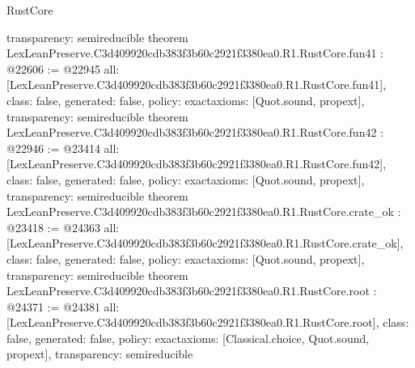 \begin{lexlean}{RustCore}
\begin{coremodule}
{  transparency: semireducible
}
theorem LexLeanPreserve.C3d409920cdb383f3b60c2921f3380ea0.R1.RustCore.fun41 : @22606 := @22945 {
  all: [LexLeanPreserve.C3d409920cdb383f3b60c2921f3380ea0.R1.RustCore.fun41],
  class: false,
  generated: false,
  policy: exact{axioms: [Quot.sound, propext]},
  transparency: semireducible
}
theorem LexLeanPreserve.C3d409920cdb383f3b60c2921f3380ea0.R1.RustCore.fun42 : @22946 := @23414 {
  all: [LexLeanPreserve.C3d409920cdb383f3b60c2921f3380ea0.R1.RustCore.fun42],
  class: false,
  generated: false,
  policy: exact{axioms: [Quot.sound, propext]},
  transparency: semireducible
}
theorem LexLeanPreserve.C3d409920cdb383f3b60c2921f3380ea0.R1.RustCore.crate_ok : @23418 := @24363 {
  all: [LexLeanPreserve.C3d409920cdb383f3b60c2921f3380ea0.R1.RustCore.crate_ok],
  class: false,
  generated: false,
  policy: exact{axioms: [Quot.sound, propext]},
  transparency: semireducible
}
theorem LexLeanPreserve.C3d409920cdb383f3b60c2921f3380ea0.R1.RustCore.root : @24371 := @24381 {
  all: [LexLeanPreserve.C3d409920cdb383f3b60c2921f3380ea0.R1.RustCore.root],
  class: false,
  generated: false,
  policy: exact{axioms: [Classical.choice, Quot.sound, propext]},
  transparency: semireducible
}


\end{coremodule}
\end{lexlean}
